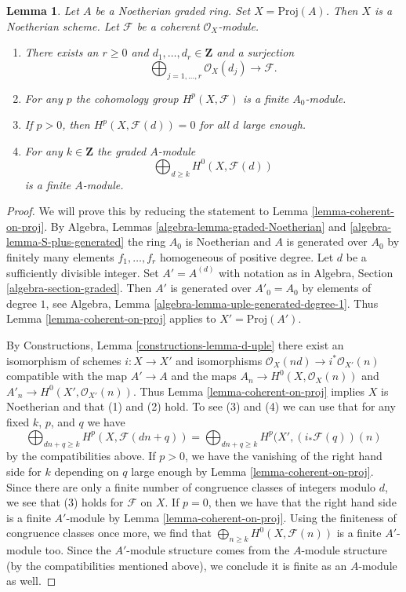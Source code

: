\documentclass{stacks-project}
\theoremstyle{plain}
\newtheorem{lemma}[subsection]{Lemma}
\theoremstyle{definition}
\theoremstyle{remark}
\numberwithin{equation}{subsection}
\begin{document}
\begin{lemma}
\label{lemma-coherent-on-proj-general}
Let $A$ be a Noetherian graded ring. Set $X = \text{Proj}(A)$. Then $X$
is a Noetherian scheme. Let $\mathcal{F}$ be a coherent $\mathcal{O}_X$-module.
\begin{enumerate}
\item There exists an $r \geq 0$ and
$d_1, \ldots, d_r \in \mathbf{Z}$ and a surjection
$$
\bigoplus\nolimits_{j = 1, \ldots, r} \mathcal{O}_X(d_j)
\longrightarrow \mathcal{F}.
$$
\item For any $p$ the cohomology group $H^p(X, \mathcal{F})$ is a finite
$A_0$-module.
\item If $p > 0$, then $H^p(X, \mathcal{F}(d)) = 0$ for all $d$ large enough.
\item For any $k \in \mathbf{Z}$ the graded $A$-module
$$
\bigoplus\nolimits_{d \geq k} H^0(X, \mathcal{F}(d))
$$
is a finite $A$-module.
\end{enumerate}
\end{lemma}

\begin{proof}
We will prove this by reducing the statement to
Lemma \ref{lemma-coherent-on-proj}.
By Algebra, Lemmas \ref{algebra-lemma-graded-Noetherian} and
\ref{algebra-lemma-S-plus-generated} the ring $A_0$ is Noetherian
and $A$ is generated over $A_0$ by finitely many elements
$f_1, \ldots, f_r$ homogeneous of positive degree.
Let $d$ be a sufficiently divisible integer. Set $A' = A^{(d)}$ with notation
as in Algebra, Section \ref{algebra-section-graded}.
Then $A'$ is generated over $A'_0 = A_0$ by elements of
degree $1$, see Algebra, Lemma \ref{algebra-lemma-uple-generated-degree-1}.
Thus Lemma \ref{lemma-coherent-on-proj} applies to $X' = \text{Proj}(A')$.

\medskip\noindent
By Constructions, Lemma \ref{constructions-lemma-d-uple} there exist
an isomorphism of schemes $i : X \to X'$ and
isomorphisms $\mathcal{O}_X(nd) \to i^*\mathcal{O}_{X'}(n)$
compatible with the map $A' \to A$ and the maps
$A_n \to H^0(X, \mathcal{O}_X(n))$ and $A'_n \to H^0(X', \mathcal{O}_{X'}(n))$.
Thus Lemma \ref{lemma-coherent-on-proj} implies $X$ is Noetherian and that
(1) and (2) hold. To see (3) and (4)
we can use that for any fixed $k$, $p$, and $q$ we have
$$
\bigoplus\nolimits_{dn + q \geq k} H^p(X, \mathcal{F}(dn + q)) =
\bigoplus\nolimits_{dn + q \geq k} H^p(X', (i_*\mathcal{F}(q))(n)
$$
by the compatibilities above. If $p > 0$, we have the vanishing of the right
hand side for $k$ depending on $q$ large enough by
Lemma \ref{lemma-coherent-on-proj}. Since there are only a finite number
of congruence classes of integers modulo $d$, we see that (3) holds for
$\mathcal{F}$ on $X$. If $p = 0$, then we have that the right hand side
is a finite $A'$-module by Lemma \ref{lemma-coherent-on-proj}. Using
the finiteness of congruence classes once more, we find that
$\bigoplus_{n \geq k} H^0(X, \mathcal{F}(n))$ is a finite $A'$-module too.
Since the $A'$-module structure comes from the $A$-module structure
(by the compatibilities mentioned above), we conclude it is finite
as an $A$-module as well.
\end{proof}
\end{document}
